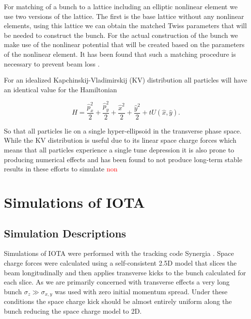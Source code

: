 \documentclass[aps,prstab,twocolumn, groupedaddress]{revtex4-1}
\begin{document}
For matching of a bunch to a lattice including an elliptic nonlinear element we use two 
versions of the lattice. The first is the base lattice without any nonlinear elements, using 
this lattice we can obtain the matched Twiss parameters that will be needed to construct 
the bunch. For the actual construction of the bunch we make use of the nonlinear 
potential that will be created based on the parameters of the nonlinear element. It has 
been found that such a matching procedure is necessary to prevent beam loss 
\cite{Webb:2015ton}. 

For an idealized  Kapchinskij-Vladimirskij (KV) distribution all particles will have an identical 
value for the Hamiltonian

	\begin{equation}
		H = \frac{\hat{p}^2_x}{2} +  \frac{\hat{p}^2_y}{2} +
		 \frac{\hat{x}^2}{2} + \frac{\hat{y}^2}{2} +
		 tU(\hat{x}, \hat{y}).
	\end{equation}

So that all particles lie on a single hyper-ellipsoid in the transverse phase space. While the 
KV distribution is useful due to its linear space charge forces which means that all 
particles experience a single tune depression
it is also prone to producing numerical effects and has been found to not produce 
long-term stable results in these efforts to simulate \textcolor{red}{non}

\section{Simulations of IOTA}
\subsection{Simulation Descriptions}

Simulations of IOTA were performed with the tracking code Synergia \cite{synergia}. Space 
charge forces were calculated using a self-consistent 2.5D model that slices the beam 
longitudinally and then applies transverse kicks to the bunch calculated for each slice. As 
we are primarily concerned with transverse effects a very long bunch $\sigma_z \gg 
\sigma_{x,y}$ was used with zero initial momentum spread. Under these conditions the 
space charge kick should be almost entirely uniform along the bunch reducing the space 
charge model to 2D. 
\end{document}
